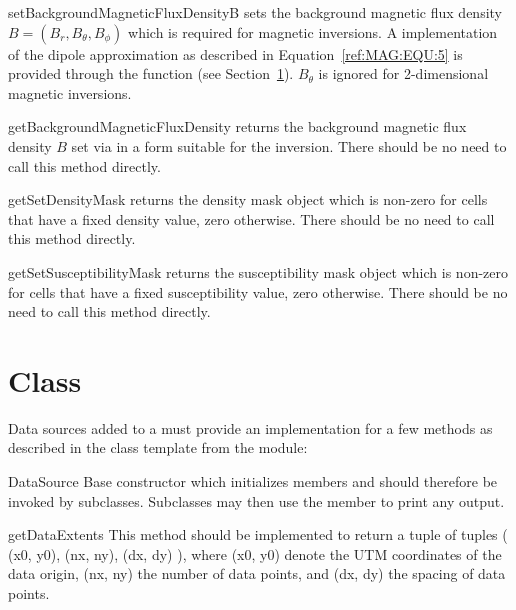 \begin{methoddesc}[DomainBuilder]{setBackgroundMagneticFluxDensity}{B}
sets the background magnetic flux density $B=(B_r,B_\theta,B_\phi)$ which is
required for magnetic inversions.
A implementation of the dipole approximation as described in
Equation~\ref{ref:MAG:EQU:5} is provided through the function
 (see Section~\ref{sec:ref:DataSource}).
$B_\theta$ is ignored for 2-dimensional magnetic inversions.
\end{methoddesc}

\begin{methoddesc}[DomainBuilder]{getBackgroundMagneticFluxDensity}{}
returns the background magnetic flux density $B$ set via
 in a form suitable for the inversion.
There should be no need to call this method directly.
\end{methoddesc}

\begin{methoddesc}[DomainBuilder]{getSetDensityMask}{}
returns the density mask \Data object which is non-zero for cells that have a
fixed density value, zero otherwise.
There should be no need to call this method directly.
\end{methoddesc}

\begin{methoddesc}[DomainBuilder]{getSetSusceptibilityMask}{}
returns the susceptibility mask \Data object which is non-zero for cells that
have a fixed susceptibility value, zero otherwise.
There should be no need to call this method directly.
\end{methoddesc}

\section{ Class}\label{sec:ref:DataSource}

Data sources added to a  must provide an implementation for
a few methods as described in the class template  from
the  module:

\begin{classdesc}{DataSource}{}
Base constructor which initializes members and should therefore be invoked by
subclasses. Subclasses may then use the member  to print any
output.
\end{classdesc}

\begin{methoddesc}[DataSource]{getDataExtents}{}
This method should be implemented to return a tuple of tuples
( (x0, y0), (nx, ny), (dx, dy) ), where (x0, y0) denote the UTM coordinates of
the data origin, (nx, ny) the number of data points, and (dx, dy) the spacing
of data points.
\end{methoddesc}

